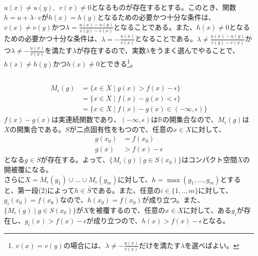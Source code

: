 \documentclass{jsarticle}
\begin{document}
\subsection{}
$u(x)\neq u(y),\ \ v(x)\neq 0$となるものが存在するとする。このとき、関数$h=u+\lambda\cdot v$が$h(x)=h(y)$となるための必要かつ十分な条件は、$v(x)\neq v(y)$かつ$\lambda=\frac{u(x)-u(y)}{v(y)-v(x)}$となることである。また、$h(x)\neq0$となるための必要かつ十分な条件は、$\lambda=-\frac{u(x)}{v(x)}$となることである。$\lambda\neq\frac{u(x)-u(y)}{v(y)-v(x)}$かつ$\lambda\neq-\frac{u(x)}{v(x)}$を満たす$\lambda$が存在するので、実数$\lambda$をうまく選んでやることで、$h(x)\neq h(y)$かつ$h(x)\neq0$とできる\footnote{$v(x)=v(y)$の場合には、$\lambda\neq-\frac{u(x)}{v(x)}$だけを満たす$\lambda$を選べばよい。}。




\subsection{}
\begin{align*}
M_\epsilon(g)&=\{x\in X \mid g(x)>f(x)-\epsilon\}\\
&=\{x\in X\mid f(x)-g(x)<\epsilon\}\\
&=\{x\in X\mid f(x)-g(x)\in(-\infty,\epsilon)\}
\end{align*}
$f(x)-g(x)$は実連続関数であり、$(-\infty,\epsilon)$は$\mathbb{R}$の開集合なので、$M_\epsilon(g)$は$X$の開集合である。$S$が二点固有性をもつので、任意の$x\in X$に対して、
\begin{align*}
g(x_0)&=f(x_0)\\
g(x)&>f(x)-\epsilon
\end{align*}
となる$g\in S$が存在する。よって、$\{M_\epsilon(g)\mid g\in S(x_0)\}$はコンパクト空間$X$の開被覆になる。\\
さらに$X=M_\epsilon(g_1)\cup\dots\cup M_\epsilon(g_m)$に対して、$h=\max(g_1,\dots,g_m)$とすると、第一段(2)によって$h\in\bar{S}$である。また、任意の$i\in\{1,..,m\}$に対して、$g_i(x_0)=f(x_0)$なので、$h(x_0)=f(x_0)$が成り立つ。また、$\{M_\epsilon(g)\mid g\in S(x_0)\}$が$X$を被覆するので、任意の$x\in X$に対して、ある$g_i$が存在し、$g_i(x)>f(x)-\epsilon$が成り立つので、$h(x)>f(x)-\epsilon$となる。

\end{document}
